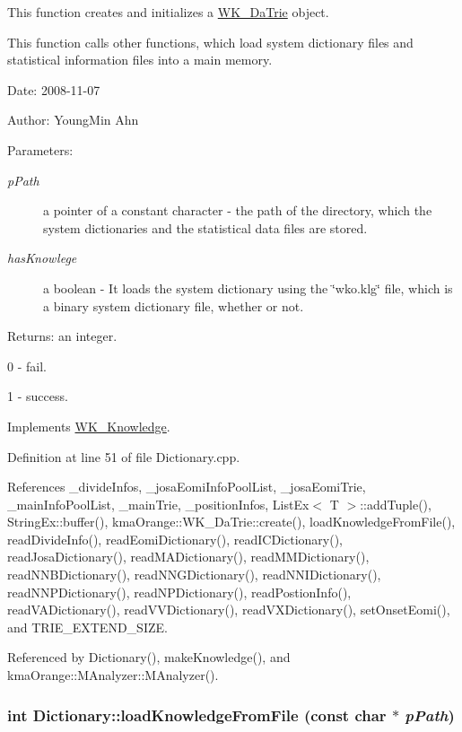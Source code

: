 This function creates and initializes a \hyperlink{classkmaOrange_1_1WK__DaTrie}{WK\_\-DaTrie} object.\par
 This function calls other functions, which load system dictionary files and statistical information files into a main memory. 

\begin{Desc}
\item[Date:]2008-11-07 \end{Desc}
\begin{Desc}
\item[Author:]YoungMin Ahn \end{Desc}
\begin{Desc}
\item[Parameters:]
\begin{description}
\item[{\em pPath}]a pointer of a constant character - the path of the directory, which the system dictionaries and the statistical data files are stored. \item[{\em hasKnowlege}]a boolean - It loads the system dictionary using the \char`\"{}wko.klg\char`\"{} file, which is a binary system dictionary file, whether or not. \end{description}
\end{Desc}
\begin{Desc}
\item[Returns:]an integer.\par
 0 - fail.\par
 1 - success. \end{Desc}


Implements \hyperlink{classWK__Knowledge_0d5580699f2b12ebee77e72ac95d45d2}{WK\_\-Knowledge}.

Definition at line 51 of file Dictionary.cpp.

References \_\-divideInfos, \_\-josaEomiInfoPoolList, \_\-josaEomiTrie, \_\-mainInfoPoolList, \_\-mainTrie, \_\-positionInfos, ListEx$<$ T $>$::addTuple(), StringEx::buffer(), kmaOrange::WK\_\-DaTrie::create(), loadKnowledgeFromFile(), readDivideInfo(), readEomiDictionary(), readICDictionary(), readJosaDictionary(), readMADictionary(), readMMDictionary(), readNNBDictionary(), readNNGDictionary(), readNNIDictionary(), readNNPDictionary(), readNPDictionary(), readPostionInfo(), readVADictionary(), readVVDictionary(), readVXDictionary(), setOnsetEomi(), and TRIE\_\-EXTEND\_\-SIZE.

Referenced by Dictionary(), makeKnowledge(), and kmaOrange::MAnalyzer::MAnalyzer().\hypertarget{classkmaOrange_1_1Dictionary_55b07fdaf668789b26249850126391d7}{
\subsubsection[{loadKnowledgeFromFile}]{\setlength{\rightskip}{0pt plus 5cm}int Dictionary::loadKnowledgeFromFile (const char $\ast$ {\em pPath})}}
\label{classkmaOrange_1_1Dictionary_55b07fdaf668789b26249850126391d7}


